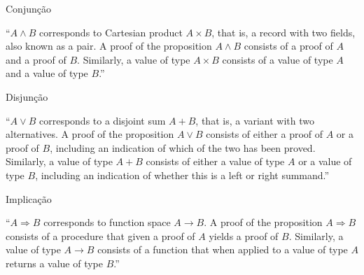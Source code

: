 \documentclass{beamer}
\begin{document}

\begin{frame}{Conjunção}

“$A \land B$ corresponds to Cartesian product $A \times B$,
that is, a record with two fields, also known as a
pair. A proof of the proposition $A \land B$ consists of a
proof of $A$ and a proof of $B$. Similarly, a value of
type $A \times B$ consists of a value of type $A$ and a
value of type $B$.”

\end{frame}


\begin{frame}{Disjunção}

“$A \lor B$ corresponds to a disjoint sum $A + B$, that
is, a variant with two alternatives. A proof of the
proposition $A \lor B$ consists of either a proof of $A$
or a proof of $B$, including an indication of which
of the two has been proved. Similarly, a value of
type $A + B$ consists of either a value of type $A$ or
a value of type $B$, including an indication of
whether this is a left or right summand.”

\end{frame}


\begin{frame}{Implicação}

“$A \Rightarrow B$ corresponds to function space $A \rightarrow B$. A proof of the proposition $A \Rightarrow B$ consists of a procedure that given a proof of $A$ yields a proof of $B$. Similarly, a value of type $A \rightarrow B$ consists of a function that when applied to a value of type $A$ returns a value of type $B$.”

\end{frame}

\end{document}
